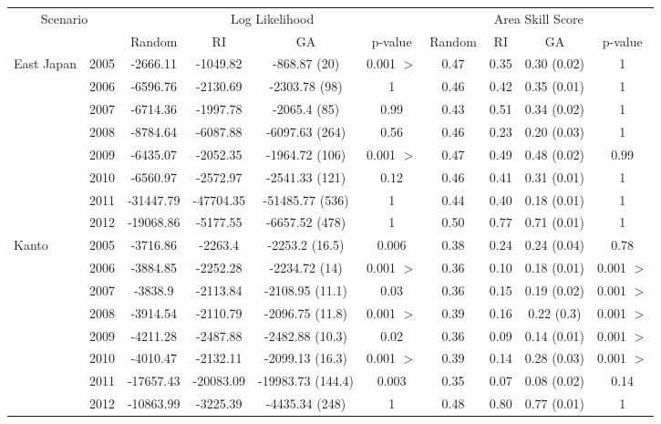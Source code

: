 \documentclass{sig-alternate}
\begin{document}
\begin{table}[t]
  \begin{center}
  \begin{tabular}{|ll||c|c|c|c||c|c|c|c|}
    \hline
    \multicolumn{2}{|c|}{Scenario} & \multicolumn{4}{|c|}{Log Likelihood} & \multicolumn{4}{|c|}{Area Skill Score}\\
     & & Random & RI & GA & p-value & Random & RI & GA & p-value\\
    \hline
    East Japan & 2005 & -2666.11  &-1049.82 &-868.87 (20) & 0.001 $>$ & 0.47 & 0.35 & 0.30 (0.02) & 1 \\
    & 2006 & -6596.76 & -2130.69  &-2303.78 (98) & 1 & 0.46 & 0.42 & 0.35 (0.01) & 1 \\
    & 2007 & -6714.36 & -1997.78  &-2065.4 (85) & 0.99 & 0.43 & 0.51 & 0.34 (0.02) & 1 \\
    & 2008 &-8784.64  & -6087.88  &-6097.63 (264) & 0.56 & 0.46 & 0.23 & 0.20 (0.03) & 1 \\
    & 2009 & -6435.07 & -2052.35  &-1964.72 (106) & 0.001 $>$ & 0.47 & 0.49 & 0.48 (0.02) & 0.99\\
    & 2010 &-6560.97  & -2572.97  &-2541.33 (121) & 0.12 & 0.46 & 0.41 & 0.31 (0.01) & 1 \\
    & 2011 & -31447.79& -47704.35 &-51485.77 (536) & 1 & 0.44 & 0.40 & 0.18 (0.01) & 1 \\
    & 2012 & -19068.86& -5177.55  &-6657.52 (478) & 1 & 0.50 & 0.77 & 0.71 (0.01) & 1 \\
    \hline
    Kanto & 2005 &-3716.86 & -2263.4&-2253.2 (16.5) & 0.006 & 0.38 & 0.24 & 0.24 (0.04) & 0.78\\
    & 2006 &-3884.85 & -2252.28     &-2234.72 (14) & 0.001 $>$ & 0.36 & 0.10 & 0.18 (0.01) & 0.001 $>$\\
    & 2007 &-3838.9 & -2113.84      &-2108.95 (11.1) & 0.03 & 0.36 & 0.15 & 0.19 (0.02) &  0.001 $>$\\
    & 2008 & -3914.54&-2110.79      &-2096.75 (11.8) & 0.001 $>$ & 0.39 & 0.16 & 0.22 (0.3) & 0.001 $>$\\
    & 2009 &-4211.28 &-2487.88      &-2482.88 (10.3) & 0.02 & 0.36 & 0.09 & 0.14 (0.01) & 0.001 $>$\\
    & 2010 & -4010.47&-2132.11      &-2099.13 (16.3) & 0.001 $>$ & 0.39 & 0.14 & 0.28 (0.03) & 0.001 $>$\\
    & 2011 &-17657.43 &-20083.09    &-19983.73 (144.4) & 0.003 & 0.35 & 0.07 & 0.08 (0.02) & 0.14\\
    & 2012 & -10863.99&-3225.39     &-4435.34 (248) & 1 & 0.48 & 0.80 & 0.77 (0.01) & 1 \\

\end{tabular}
\end{center}
\end{table}
\end{document}
